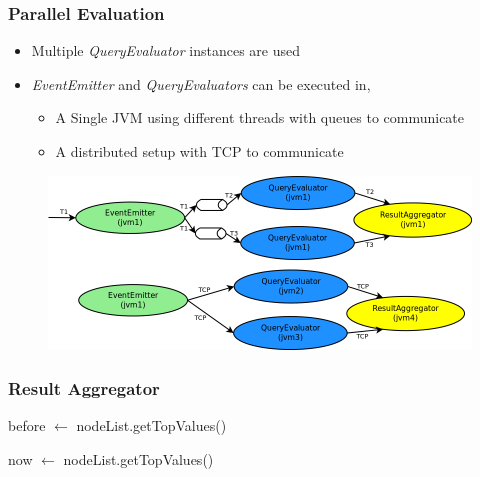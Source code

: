 \documentclass{beamer}
\begin{document}
\begin{frame}
\frametitle{Parallel Evaluation}

\begin{itemize}
        \item Multiple \textit{QueryEvaluator} instances are used
        \item \textit{EventEmitter} and \textit{QueryEvaluators} can be executed in,
                \begin{itemize}
                        \item A Single JVM using different threads with queues to communicate
                        \item A distributed setup with TCP to communicate
                \end{itemize}
\end{itemize}

\begin{figure}
        \includegraphics[width=0.8\linewidth]{parallel.png}
\end{figure}

\end{frame}

\begin{frame}
\frametitle{Result Aggregator}

\begin{algorithm}[H]
\footnotesize
before $\gets$ nodeList.getTopValues()\;


now $\gets$ nodeList.getTopValues()\;

\end{algorithm}

\end{frame}
\end{document}
